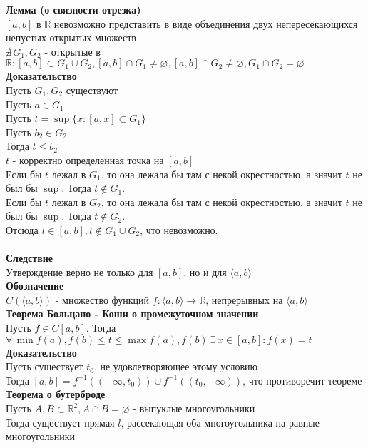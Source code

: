 \documentclass[12pt]{article}
\begin{document}
\textbf{Лемма (о связности отрезка)}\\
$[a,b]$ в $\mathbb{R}$ невозможно представить в виде объединения двух непересекающихся непустых открытых множеств\\
$\nexists\,G_1, G_2$ - открытые в $\mathbb{R}: [a,b] \subset G_1 \cup G_2, [a,b] \cap G_1 \neq \varnothing, [a,b] \cap G_2 \neq \varnothing, G_1 \cap G_2 = \varnothing$\\
\textbf{Доказательство}\\
Пусть $G_1, G_2$ существуют\\
Пусть $a \in G_1$\\
Пусть $t = \sup \{x: [a,x] \subset G_1\}$\\
Пусть $b_2 \in G_2$\\
Тогда $t \leq b_2$\\
$t$ - корректно определенная точка на $[a,b]$\\
Если бы $t$ лежал в $G_1$, то она лежала бы там с некой окрестностью, а значит $t$ не был бы $\sup$. Тогда $t \notin G_1$.\\
Если бы $t$ лежал в $G_2$, то она лежала бы там с некой окрестностью, а значит $t$ не был бы $\sup$. Тогда $t \notin G_2$.\\
Отсюда $t \in [a,b], t \notin G_1 \cup G_2$, что невозможно.\\\\
\textbf{Следствие}\\
Утверждение верно не только для $[a,b]$, но и для $\langle a, b\rangle$\\
\textbf{Обозначение}\\
$C(\langle a,b\rangle)$ - множество функций $f:\langle a,b\rangle \rightarrow \mathbb{R}$, непрерывных на $\langle a,b\rangle$\\
\textbf{Теорема Больцано - Коши о промежуточном значении}\\
Пусть $f \in C[a,b]$. Тогда $\forall\,\min f(a),f(b) \leq t \leq \max f(a),f(b)\ \exists\,x\in[a,b]: f(x)=t$\\
\textbf{Доказательство}\\
Пусть существует $t_0$, не удовлетворяющее этому условию\\
Тогда $[a,b] = f^{-1}((-\infty, t_0)) \cup f^{-1}((t_0, -\infty))$, что противоречит теореме\\
\textbf{Теорема о бутерброде}\\
Пусть $A,B \subset \mathbb{R}^2, A\cap B = \varnothing$ - выпуклые многоугольники\\
Тогда существует прямая $l$, рассекающая оба многоугольника на равные многоугольники\\
\end{document}
